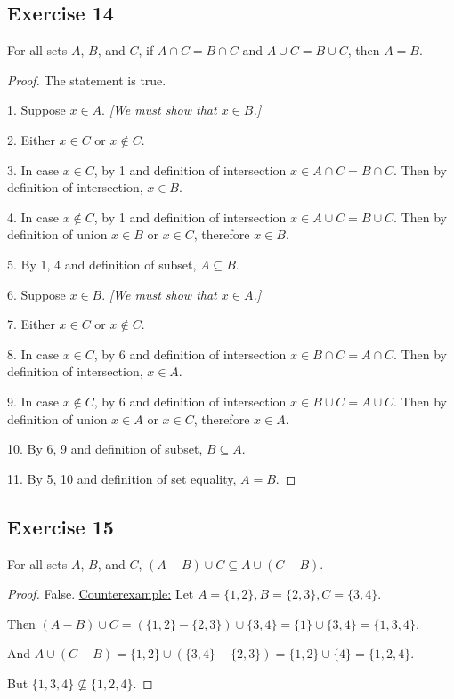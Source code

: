 \documentclass[14pt]{extarticle}
\begin{document}
\subsection{Exercise 14}
For all sets $A$, $B$, and $C$, if \(A \cap C = B \cap C\) and \(A \cup C = B \cup C\), then $A = B$.

\begin{proof}
  The statement is true.

  1. Suppose \(x \in A\). {\it [We must show that \(x \in B\).]}

  2. Either \(x \in C\) or \(x \notin C\).

  3. In case \(x \in C\), by 1 and definition of intersection \(x \in A \cap C = B \cap C\).
  Then by definition of intersection, \(x \in B\).

  4. In case \(x \notin C\), by 1 and definition of intersection \(x \in A \cup C = B \cup C\).
  Then by definition of union \(x \in B\) or \(x \in C\), therefore \(x \in B\).

  5. By 1, 4 and definition of subset, \(A \subseteq B\).

  6. Suppose \(x \in B\). {\it [We must show that \(x \in A\).]}

  7. Either \(x \in C\) or \(x \notin C\).

  8. In case \(x \in C\), by 6 and definition of intersection \(x \in B \cap C = A \cap C\).
  Then by definition of intersection, \(x \in A\).

  9. In case \(x \notin C\), by 6 and definition of intersection \(x \in B \cup C = A \cup C\).
  Then by definition of union \(x \in A\) or \(x \in C\), therefore \(x \in A\).

  10. By 6, 9 and definition of subset, \(B \subseteq A\).

  11. By 5, 10 and definition of set equality, $A = B$.
\end{proof}

\subsection{Exercise 15}
For all sets $A$, $B$, and $C$, \((A - B) \cup C \subseteq A \cup (C - B)\).

\begin{proof}
  False. \underline{Counterexample:} Let \(A = \{1, 2\}, B = \{2, 3\}, C = \{3, 4\}\).

  Then \((A - B) \cup C = (\{1, 2\} - \{2, 3\}) \cup \{3, 4\} = \{1\} \cup \{3, 4\} = \{1, 3, 4\}\).

  And \(A \cup (C - B) = \{1, 2\} \cup (\{3, 4\} - \{2, 3\}) = \{1, 2\} \cup \{4\} = \{1, 2, 4\}\).

  But \(\{1, 3, 4\} \nsubseteq \{1, 2, 4\}\).
\end{proof}
\end{document}
